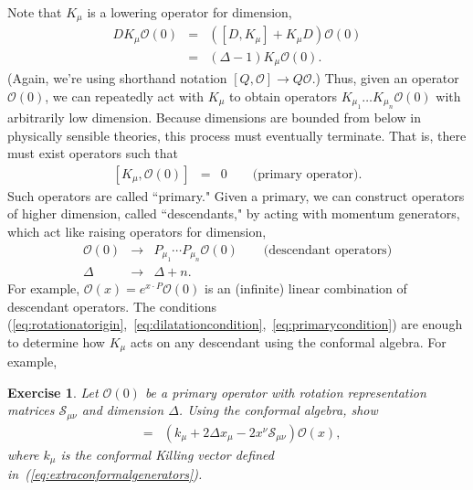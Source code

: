 \documentclass[11pt]{ws-rv9x6}
\newcommand\be{\begin{eqnarray}}
\newcommand\ee{\end{eqnarray}}
\newcommand\cO{\mathcal{O}}
\newcommand\<\langle
\renewcommand\>\rangle
\newcommand\nn{\nonumber}
\renewcommand\.{\cdot}
\newcommand\De{\Delta}
\newcommand\cS{\mathcal{S}}
\newtheorem{exercise}{Exercise}[section]
\begin{document}
Note that $K_\mu$ is a lowering operator for dimension,
\be
D K_\mu \cO(0) &=& ([D,K_\mu] + K_\mu D)\cO(0)\nn\\
&=& (\De-1)K_\mu \cO(0).
\ee
(Again, we're using shorthand notation $[Q,\cO]\to Q\cO$.)  Thus, given an operator $\cO(0)$, we can repeatedly act with $K_\mu$ to obtain operators $K_{\mu_1}\dots K_{\mu_n}\cO(0)$ with arbitrarily low dimension.  Because dimensions are bounded from below in physically sensible theories, this process must eventually terminate.  That is, there must exist operators such that
\be
\label{eq:primarycondition}
[K_\mu,\cO(0)] &=& 0\qquad\textrm{(primary operator)}.
\ee
Such operators are called ``primary."  Given a primary, we can construct operators of higher dimension, called ``descendants," by acting with momentum generators, which act like raising operators for dimension,
\be
\cO(0) &\to& P_{\mu_1}\cdots P_{\mu_n}\cO(0)\qquad\textrm{(descendant operators)}\nn\\
\De &\to& \De+n.
\ee
For example, $\cO(x)=e^{x\.P}\cO(0)$ is an (infinite) linear combination of descendant operators.
The conditions (\ref{eq:rotationatorigin},~\ref{eq:dilatationcondition},~\ref{eq:primarycondition}) are enough to determine how $K_\mu$ acts on any descendant using the conformal algebra.  For example,
\begin{exercise}
Let $\cO(0)$ be a primary operator with rotation representation matrices $\cS_{\mu\nu}$ and dimension $\Delta$.  Using the conformal algebra, show
\be
[K_\mu, \cO(x)] &=& (k_\mu + 2\De x_\mu - 2x^\nu \cS_{\mu\nu})\cO(x),
\label{eq:actionofK}
\ee
where $k_\mu$ is the conformal Killing vector defined in~(\ref{eq:extraconformalgenerators}). 
\end{exercise}
\end{document}
